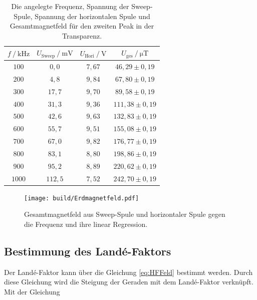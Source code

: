 \begin{table}[H]
    \centering
    \caption{Die angelegte Frequenz, Spannung der Sweep-Spule, Spannung der horizontalen Spule und Gesamtmagnetfeld für den zweiten Peak in der Transparenz.}
    \label{tab:Messung2}
    \begin{tabular}{c c c c}
    \toprule
      $ f \mathbin{/} \unit{\kilo\hertz}$ & $U_{\text{Sweep}} \mathbin{/} \unit{\milli\volt}$ & $U_{\text{Hori}} \mathbin{/} \unit{\volt}$ & $U_{\text{ges}} \mathbin{/} \unit{\micro\tesla}$ \\
    \midrule
        $100$ &     $ 0,0    $    &   $7,67$     &$46,29   \pm 0,19$     \\ 
        $200$ &     $ 4,8  $    &   $9,84$     &$67,80   \pm 0,19$     \\ 
        $300$ &     $ 17,7 $    &   $9,70$     &$89,58   \pm 0,19$    \\ 
        $400$ &     $ 31,3 $    &   $9,36$     &$111,38  \pm 0,19$    \\ 
        $500$ &     $ 42,6 $    &   $9,63$     &$132,83  \pm 0,19$    \\ 
        $600$ &     $ 55,7 $    &   $9,51$     &$155,08  \pm 0,19$    \\ 
        $700$ &     $ 67,0 $    &   $9,82$     &$176,77  \pm 0,19$    \\ 
        $800$ &     $ 83,1 $    &   $8,80$     &$198,86  \pm 0,19$    \\ 
        $900$ &     $ 95,2 $    &   $8,89$     &$220,62  \pm 0,19$    \\ 
        $1000$ &    $ 112,5$    &   $7,52$     &$242,70  \pm 0,19$    \\ 
    \bottomrule
    \end{tabular}
    \end{table}


\begin{figure}[H]
    \centering
    \texttt{[image: build/Erdmagnetfeld.pdf]}
    \caption{Gesamtmagnetfeld aus Sweep-Spule und horizontaler Spule gegen die Frequenz und ihre linear Regression.}
    \label{fig:Gesamtmagnetfeld}
\end{figure}

\subsection{Bestimmung des Landé-Faktors}

Der Landé-Faktor kann über die Gleichung \eqref{eq:HFFeld} bestimmt werden.
Durch diese Gleichung wird die Steigung der Geraden mit dem Landé-Faktor verknüpft.
Mit der Gleichung

